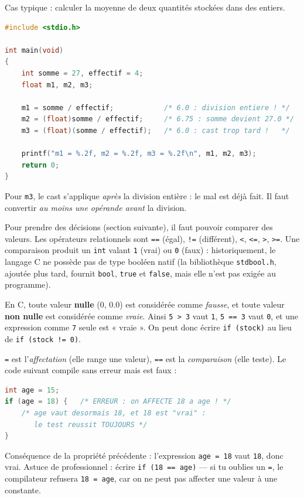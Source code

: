 \documentclass[11pt]{article}
\newcounter{popsec}
\newcounter{popsub}
\newcommand{\courssub}[1]{%
  \stepcounter{popsub}%
  \par\vspace{9pt}\noindent{\popxbold\fontsize{11.5}{13}\selectfont\color{popink}{\color{poporange}\thepopsec.\thepopsub}\hspace{6pt}#1}\par\nopagebreak\vspace{4pt}
}
\begin{document}
\begin{exemplebox}
Cas typique : calculer la moyenne de deux quantités stockées dans des entiers.
\begin{lstlisting}[language=C]
#include <stdio.h>

int main(void)
{
    int somme = 27, effectif = 4;
    float m1, m2, m3;

    m1 = somme / effectif;            /* 6.0 : division entiere ! */
    m2 = (float)somme / effectif;     /* 6.75 : somme devient 27.0 */
    m3 = (float)(somme / effectif);   /* 6.0 : cast trop tard !   */

    printf("m1 = %.2f, m2 = %.2f, m3 = %.2f\n", m1, m2, m3);
    return 0;
}
\end{lstlisting}
Pour \texttt{m3}, le cast s'applique \emph{après} la division entière : le mal est déjà fait. Il faut convertir \emph{au moins une opérande avant} la division.
\end{exemplebox}

\courssub{Opérateurs relationnels et logiques}

Pour prendre des décisions (section suivante), il faut pouvoir comparer des valeurs. Les opérateurs relationnels sont \texttt{==} (égal), \texttt{!=} (différent), \texttt{<}, \texttt{<=}, \texttt{>}, \texttt{>=}. Une comparaison produit un \texttt{int} valant \texttt{1} (vrai) ou \texttt{0} (faux) : historiquement, le langage C ne possède pas de type booléen natif (la bibliothèque \texttt{stdbool.h}, ajoutée plus tard, fournit \texttt{bool}, \texttt{true} et \texttt{false}, mais elle n'est pas exigée au programme).

\begin{propriete}
En C, toute valeur \textbf{nulle} ($0$, $0.0$) est considérée comme \emph{fausse}, et toute valeur \textbf{non nulle} est considérée comme \emph{vraie}. Ainsi \texttt{5 > 3} vaut \texttt{1}, \texttt{5 == 3} vaut \texttt{0}, et une expression comme \texttt{7} seule est « vraie ». On peut donc écrire \texttt{if (stock)} au lieu de \texttt{if (stock != 0)}.
\end{propriete}

\begin{attention}[Le piège n°1 du débutant : \texttt{=} contre \texttt{==}]
\texttt{=} est l'\emph{affectation} (elle range une valeur), \texttt{==} est la \emph{comparaison} (elle teste). Le code suivant compile sans erreur mais est faux :
\begin{lstlisting}[language=C]
int age = 15;
if (age = 18) {   /* ERREUR : on AFFECTE 18 a age ! */
    /* age vaut desormais 18, et 18 est "vrai" :
       le test reussit TOUJOURS */
}
\end{lstlisting}
Conséquence de la propriété précédente : l'expression \texttt{age = 18} vaut \texttt{18}, donc vrai. Astuce de professionnel : écrire \texttt{if (18 == age)} — si tu oublies un \texttt{=}, le compilateur refusera \texttt{18 = age}, car on ne peut pas affecter une valeur à une constante.
\end{attention}
\end{document}
